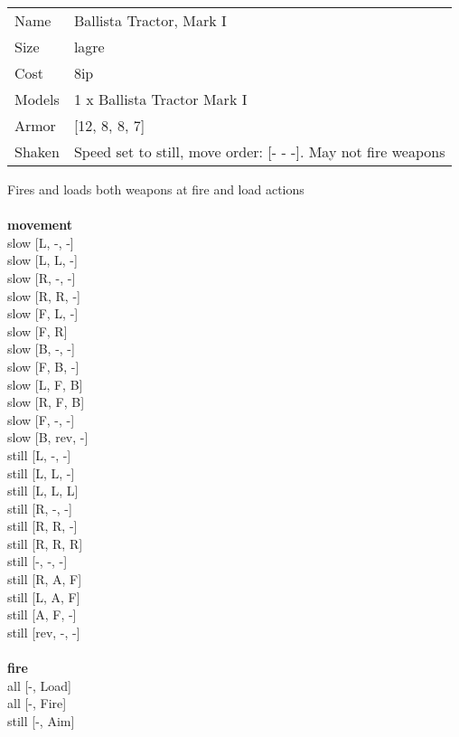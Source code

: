 \begin{tabular}{ll}
  Name & Ballista Tractor, Mark I \\
  Size & lagre\\
  Cost & 8ip\\
  Models & 1 x Ballista Tractor Mark I\\
  Armor & [12, 8, 8, 7]\\
  Shaken & Speed set to still, move order: [- - -]. May not fire weapons\\
\end{tabular}

\noindent Fires and loads both weapons at fire and load actions\\ 


\ \\ {\bf movement } \\
slow [L, -, -] \\
slow [L, L, -] \\
slow [R, -, -] \\
slow [R, R, -] \\
slow [F, L, -] \\
slow [F, R] \\
slow [B, -, -] \\
slow [F, B, -] \\
slow [L, F, B] \\
slow [R, F, B] \\
slow [F, -, -] \\
slow [B, rev, -] \\
still [L, -, -] \\
still [L, L, -] \\
still [L, L, L] \\
still [R, -, -] \\
still [R, R, -] \\
still [R, R, R] \\
still [-, -, -] \\
still [R, A, F] \\
still [L, A, F] \\
still [A, F, -] \\
still [rev, -, -] \\
\ \\ {\bf fire } \\
all [-, Load] \\
all [-, Fire] \\
still [-, Aim] \\


